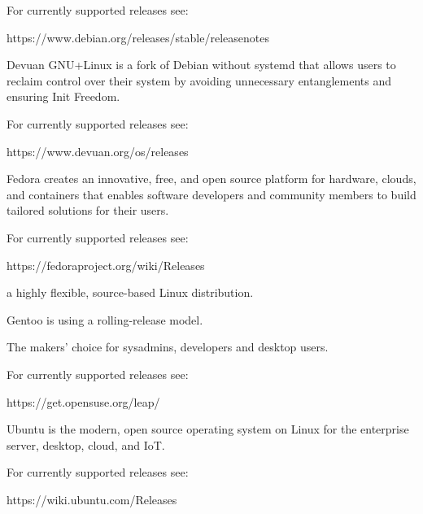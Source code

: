 For currently supported releases see:

https://www.debian.org/releases/stable/releasenotes

Devuan GNU+Linux is a fork of Debian without systemd that allows users to reclaim control over their system by avoiding unnecessary entanglements and ensuring Init Freedom.

For currently supported releases see:

https://www.devuan.org/os/releases

Fedora creates an innovative, free, and open source platform for hardware, clouds, and containers that enables software developers and community members to build tailored solutions for their users.

For currently supported releases see:

https://fedoraproject.org/wiki/Releases

a highly flexible, source-based Linux distribution.

Gentoo is using a rolling-release model.

The makers' choice for sysadmins, developers and desktop users.

For currently supported releases see:

https://get.opensuse.org/leap/

Ubuntu is the modern, open source operating system on Linux for the enterprise server, desktop, cloud, and IoT.

For currently supported releases see:

https://wiki.ubuntu.com/Releases

\begin{table}[htbp]

\centering

\begin{tabular}

\end{tabular}

\end{table}

\begin{table}[htbp]

\centering

\begin{tabular}

\end{tabular}

\end{table}

\begin{table}[htbp]

\centering

\begin{tabular}

\end{tabular}

\end{table}

